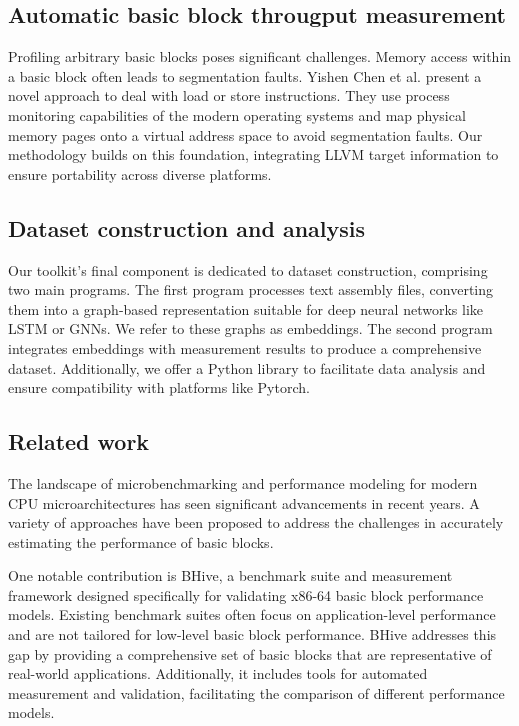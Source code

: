 \subsection{Automatic basic block througput measurement}

Profiling arbitrary basic blocks poses significant challenges. Memory access within a basic block often 
leads to segmentation faults. Yishen Chen et al.\cite{chenBHiveBenchmarkSuite2019} present a novel 
approach to deal with load or store instructions. They use process monitoring capabilities of the modern 
operating systems and map physical memory pages onto a virtual address space to avoid segmentation faults. 
Our methodology builds on this foundation, integrating LLVM target information to ensure portability 
across diverse platforms.

\subsection{Dataset construction and analysis}

Our toolkit's final component is dedicated to dataset construction, comprising two main programs. 
The first program processes text assembly files, converting them into a graph-based representation 
suitable for deep neural networks like LSTM or GNNs. We refer to these graphs as embeddings. 
The second program integrates embeddings with measurement results to produce a comprehensive dataset. 
Additionally, we offer a Python library to facilitate data analysis and ensure compatibility with 
platforms like Pytorch.

\subsection{Related work}

The landscape of microbenchmarking and performance modeling for modern CPU microarchitectures has 
seen significant advancements in recent years. A variety of approaches have been proposed to address 
the challenges in accurately estimating the performance of basic blocks.

One notable contribution is BHive, a benchmark suite and measurement framework designed specifically 
for validating x86-64 basic block performance models\cite{chenBHiveBenchmarkSuite2019}. Existing 
benchmark suites often focus on application-level performance and are not tailored for low-level 
basic block performance. BHive addresses this gap by providing a comprehensive set of basic blocks 
that are representative of real-world applications. Additionally, it includes tools for automated 
measurement and validation, facilitating the comparison of different performance models.

